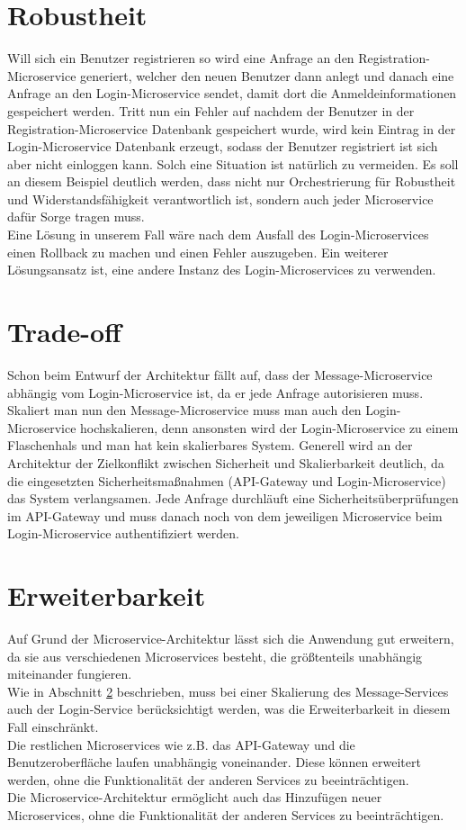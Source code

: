  \section{Robustheit}
 Will sich ein Benutzer registrieren so wird eine Anfrage an den Registration-Microservice generiert, welcher den neuen Benutzer dann anlegt und danach eine Anfrage an den Login-Microservice sendet, damit dort die Anmeldeinformationen gespeichert werden. Tritt nun ein Fehler auf nachdem der Benutzer in der Registration-Microservice Datenbank gespeichert wurde, wird kein Eintrag in der Login-Microservice Datenbank erzeugt, sodass der Benutzer registriert ist sich aber nicht einloggen kann. Solch eine Situation ist natürlich zu vermeiden. Es soll an diesem Beispiel deutlich werden, dass nicht nur Orchestrierung für Robustheit und Widerstandsfähigkeit verantwortlich ist, sondern auch jeder Microservice dafür Sorge tragen muss.\\
 Eine Lösung in unserem Fall wäre nach dem Ausfall des Login-Microservices einen Rollback zu machen und einen Fehler auszugeben. Ein weiterer Lösungsansatz ist, eine andere Instanz des Login-Microservices zu verwenden.
 
\section{Trade-off}
\label{tradeoff}
Schon beim Entwurf der Architektur fällt auf, dass der Message-Microservice abhängig vom Login-Microservice ist, da er jede Anfrage autorisieren muss. Skaliert man nun den Message-Microservice muss man auch den Login-Microservice hochskalieren, denn ansonsten wird der Login-Microservice zu einem Flaschenhals und man hat kein skalierbares System. Generell wird an der Architektur der Zielkonflikt zwischen Sicherheit und Skalierbarkeit deutlich, da die eingesetzten Sicherheitsmaßnahmen (API-Gateway und Login-Microservice) das System verlangsamen. Jede Anfrage durchläuft eine Sicherheitsüberprüfungen im API-Gateway und muss danach noch von dem jeweiligen Microservice beim Login-Microservice authentifiziert werden.


\section{Erweiterbarkeit}
Auf Grund der Microservice-Architektur lässt sich die Anwendung gut erweitern, da sie aus verschiedenen Microservices besteht, die größtenteils unabhängig miteinander fungieren.\\
Wie in Abschnitt \ref{tradeoff} beschrieben, muss bei einer Skalierung des Message-Services auch der Login-Service berücksichtigt werden, was die Erweiterbarkeit in diesem Fall einschränkt.\\
Die restlichen Microservices wie z.B. das API-Gateway und die Benutzeroberfläche laufen unabhängig voneinander. Diese können erweitert werden, ohne die Funktionalität der anderen Services zu beeinträchtigen.\\
Die Microservice-Architektur ermöglicht auch das Hinzufügen neuer Microservices, ohne die Funktionalität der anderen Services zu beeinträchtigen.